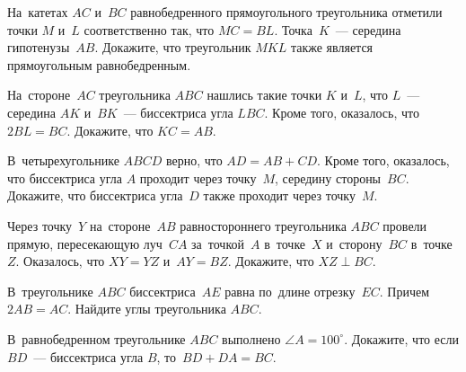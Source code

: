 


\begin{problems}

\item
На~катетах $AC$ и~$BC$ равнобедренного прямоугольного треугольника отметили
точки $M$ и~$L$ соответственно так, что $MC = BL$.
Точка~$K$~--- середина гипотенузы~$AB$.
Докажите, что треугольник $MKL$ также является прямоугольным равнобедренным.

\item
На~стороне~$AC$ треугольника $ABC$ нашлись такие точки $K$ и~$L$, что
$L$~--- середина $AK$ и~$BK$~--- биссектриса угла $LBC$.
Кроме того, оказалось, что $2 BL = BC$.
Докажите, что $KC = AB$.

\item
В~четырехугольнике $ABCD$ верно, что $AD = AB + CD$.
Кроме того, оказалось, что биссектриса угла $A$ проходит через точку~$M$,
середину стороны~$BC$.
Докажите, что биссектриса угла~$D$ также проходит через точку~$M$.

\item
Через точку~$Y$ на~стороне~$AB$ равностороннего треугольника $ABC$ провели
прямую, пересекающую луч~$CA$ за~точкой~$A$ в~точке~$X$ и~сторону~$BC$
в~точке~$Z$.
Оказалось, что $XY = YZ$
и~$AY = BZ$.
Докажите, что $XZ \perp BC$.

\item
В~треугольнике $ABC$ биссектриса~$AE$ равна по~длине отрезку~$EC$.
Причем $2 AB = AC$.
Найдите углы треугольника $ABC$.

\item
В~равнобедренном треугольнике $ABC$ выполнено $\angle A = 100^{\circ}$.
Докажите, что если $BD$~--- биссектриса угла $B$, то~$BD + DA = BC$.

\end{problems}

